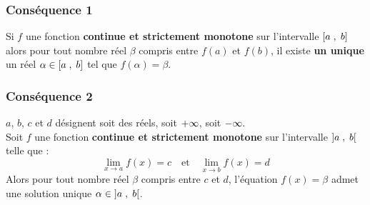  \subsubsection*{Conséquence 1}
  Si $ f $ une fonction \textbf{\color{magenta}continue et strictement monotone} sur  l'intervalle $ \left[a\;,\; b\right] $ alors pour tout nombre réel $ \beta $ compris entre $f(a) $ et $f(b) $, il existe  \textbf{\color{magenta}un unique} un réel $ \alpha \in \left[a\;,\; b\right] $ tel que $ f(\alpha)= \beta. $
 \subsubsection*{Conséquence 2}
 $ a$, $b$,  $c $  et $ d$ désignent soit des réels, soit $ +\infty $, soit $ -\infty. $\\
  Soit $ f $ une fonction \textbf{\color{magenta}continue et strictement monotone} sur  l'intervalle $ \left]a \;,\; b\right[ $ telle que :
   \[\displaystyle \lim_{x \to a}f(x)=c \quad \textrm{et}\quad \displaystyle\lim_{x \to b}f(x)=d\]
Alors pour tout nombre réel $ \beta $ compris entre $c $ et $d $, l'équation $ f(x)=\beta $ admet une solution  unique $ \alpha \in \left]a \;,\; b\right[ $.\\


